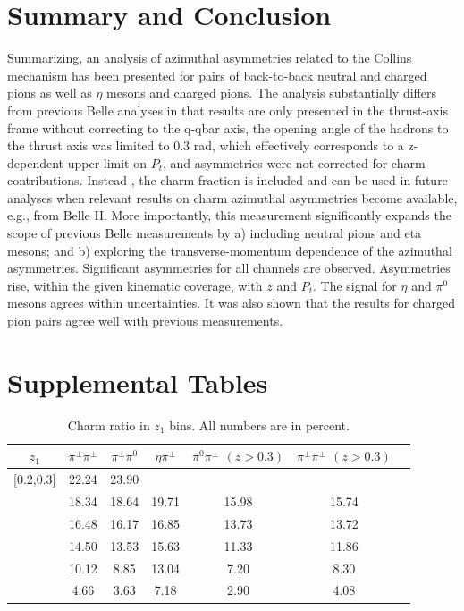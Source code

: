 \documentclass[aps,prX,preprint,groupedaddress,linenumbers]{revtex4-1}
\begin{document}
\section{Summary and Conclusion}
\label{sec:summary}
Summarizing, an analysis of azimuthal asymmetries related to the Collins mechanism has been presented for pairs of back-to-back neutral and charged pions as well as $\eta$ mesons and charged pions. The analysis substantially differs from previous Belle analyses in that results are only presented in the thrust-axis frame without correcting to the q-qbar axis, the opening angle of the hadrons to the thrust axis was limited to 0.3 rad, which effectively corresponds to a z-dependent upper limit on $P_t$, and asymmetries were not corrected for charm contributions. Instead , the charm fraction is included and can be used in future analyses when relevant results on charm azimuthal asymmetries become available, e.g., from Belle II. More importantly, this measurement significantly expands the scope of previous Belle measurements by a) including neutral pions and eta mesons; and b) exploring the transverse-momentum dependence of the azimuthal asymmetries.
 Significant asymmetries for all channels are observed. Asymmetries rise, within the given kinematic coverage, with $z$ and $P_t$. The signal for $\eta$ and $\pi^0$ mesons agrees within uncertainties. It was also shown that the results for charged pion pairs agree well with previous measurements.

\clearpage

\clearpage


\appendix
\section{Supplemental Tables}



 \begin{table}[h]
\centering
\begin{tabular}{|c||c|c|c|c|c|c|}
\hline
$z_1$ & $\pi^{\pm}\pi^{\pm}$ & $\pi^{\pm}\pi^0$ & $\eta\pi^{\pm}$ & $\pi^0\pi^{\pm}$ $(z>0.3)$ & $\pi^{\pm}\pi^{\pm}$ $(z>0.3)$ \\ \hline\hline
[0.2,0.3]	&	22.24	&	23.90	&		&		&		\\ \hline
[0.3,0.4]	&	18.34	&	18.64	&	19.71	&	15.98	&	15.74	\\ \hline
[0.4,0.5]	&	16.48	&	16.17	&	16.85	&	13.73	&	13.72	\\ \hline
[0.5,0.6]	&	14.50	&	13.53	&	15.63	&	11.33	&	11.86	\\ \hline
[0.6,0.7]	&	10.12	&	8.85	&	13.04	&	7.20	&	8.30	\\ \hline
[0.7,1.0]	&	4.66	&	3.63	&	7.18	&	2.90	&	4.08	\\ \hline\end{tabular}
\caption[Charm ratio in $z_1$ bins]{Charm ratio in $z_1$ bins. All numbers are in percent.}
\label{tab:sinzcharmratio}
\end{table}
\end{document}
